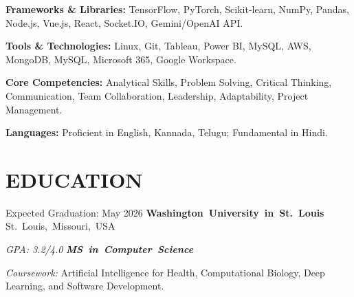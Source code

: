 \documentclass[10pt, letterpaper]{article}
\begin{document}
\vspace{\entrySpacing}
\begin{onecolentry}
    \textbf{Frameworks \& Libraries:} TensorFlow, PyTorch, Scikit-learn, NumPy, Pandas, Node.js, Vue.js, React, Socket.IO, Gemini/OpenAI API.
\end{onecolentry}

\vspace{\entrySpacing}
\begin{onecolentry}
    \textbf{Tools \& Technologies:} Linux, Git, Tableau, Power BI, MySQL, AWS, MongoDB, MySQL, Microsoft 365, Google Workspace.
\end{onecolentry}

\vspace{\entrySpacing}
\begin{onecolentry}
    \textbf{Core Competencies:} Analytical Skills, Problem Solving, Critical Thinking, Communication, Team Collaboration, Leadership, Adaptability, Project Management.
\end{onecolentry}

\vspace{\entrySpacing}
\begin{onecolentry}
    \textbf{Languages:} Proficient in English, Kannada, Telugu; Fundamental in Hindi.
\end{onecolentry}

\vspace{\headerSpacing}
\section{EDUCATION}

\vspace{\entrySpacing}
\begin{twocolentry}{Expected Graduation: May 2026}
    \mbox{\textbf{Washington University in St. Louis}
        \kern {}
        \AND
        \kern {}}
    \mbox{St. Louis, Missouri, USA}
\end{twocolentry}

\begin{twocolentry}{\textsl{GPA: 3.2/4.0}}
    \mbox{\textbf{\textsl{MS in Computer Science}}}
\end{twocolentry}

\begin{onecolentry}
    \begin{highlights}
        \textit{Coursework:} Artificial Intelligence for Health, Computational Biology, Deep Learning, and Software Development.
    \end{highlights}
\end{onecolentry}
\end{document}
